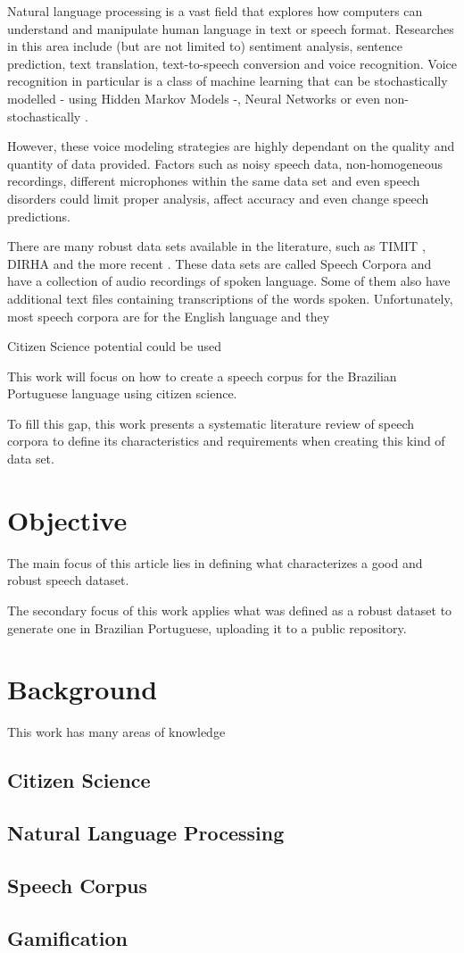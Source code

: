 Natural language processing is a vast field that explores how computers can understand and manipulate human language in text or speech format. Researches in this area include (but are not limited to) sentiment analysis, sentence prediction, text translation, text-to-speech conversion and voice recognition. Voice recognition in particular is a class of machine learning that can be stochastically modelled - using Hidden Markov Models \cite{gales2008application} -, Neural Networks \cite{graves2013speech} or even non-stochastically \cite{burget2003nonrandomattr}.

However, these voice modeling strategies are highly dependant on the quality and quantity of data provided. Factors such as noisy speech data, non-homogeneous recordings, different microphones within the same data set and even speech disorders could limit proper analysis, affect accuracy and even change speech predictions. 

There are many robust data sets available in the literature, such as TIMIT \cite{Lamel1992timmit}, DIRHA \cite{Ravanelli2016dirha} and the more recent \cite{chanchaochai2018globaltimit}. These data sets are called Speech Corpora and have a collection of audio recordings of spoken language. Some of them also have additional text files containing transcriptions of the words spoken. Unfortunately, most speech corpora are for the English language \cite{LeRouxVincent2014TRdatasets} and they 

Citizen Science potential could be used

This work will focus on how to create a speech corpus for the Brazilian Portuguese language using citizen science.

To fill this gap, this work presents a systematic literature review of speech corpora to define its characteristics and requirements when creating this kind of data set.

\chapter{Objective}

The main focus of this article lies in defining what characterizes a good and robust speech dataset.

The secondary focus of this work applies what was defined as a robust dataset to generate one in Brazilian Portuguese, uploading it to a public repository. 

\chapter{Background}

This work has many areas of knowledge

\section{Citizen Science}

\section{Natural Language Processing}

\section{Speech Corpus}

\section{Gamification}
